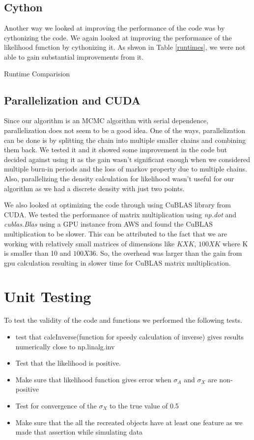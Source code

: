 \documentclass{article}
\begin{document}
\subsection{Cython}
Another way we looked at improving the performance of the code was by cythonizing the code. We again looked at improving the performance of the likelihood function by cythonizing it. As shwon in Table \ref{runtimes}, we were not able to gain substantial improvements from it.\\

\begin{table}[ht]
\centering
\caption{Runtime Comparision \label{runtimes}}

\end{table}

\subsection{Parallelization and CUDA}
Since our algorithm is an MCMC algorithm with serial dependence, parallelization does not seem to be a good idea. One of the ways, parallelization can be done is by splitting the chain into multiple smaller chains and combining them back. We tested it and it showed some improvement in the code but decided against using it as the gain wasn't significant enough when we considered multiple burn-in periods and the loss of markov property due to multiple chains. Also, parallelizing the density calculation for likelihood wasn't useful for our algorithm as we had a discrete density with just two points.

We also looked at optimizing the code through using CuBLAS library from CUDA. We tested the performance of matrix multiplication using \textit{np.dot} and \textit{cublas.Blas} using a GPU instance from AWS and found the CuBLAS multiplication to be slower. This can be attributed to the fact that we are working with relatively small matrices of dimensions like $KXK$, $100XK$ where K is smaller than 10 and  $100X36$. So, the overhead was larger than the gain from gpu calculation resulting in slower time for CuBLAS matrix multiplication.


\section{Unit Testing}
To test the validity of the code and functions we performed the following tests.

\begin{itemize}
\item{test that calcInverse(function for speedy calculation of inverse) gives results numerically close to np.linalg.inv}
\item{Test that the likelihood is positive.}
\item{Make sure that likelihood function gives error when $\sigma_A$ and $\sigma_X$ are non-positive}
\item{Test for convergence of the $\sigma_X$ to the true value of 0.5}
\item{Make sure that the all the recreated objects have at least one feature as we made that assertion while simulating data}
\end{itemize}
\end{document}
